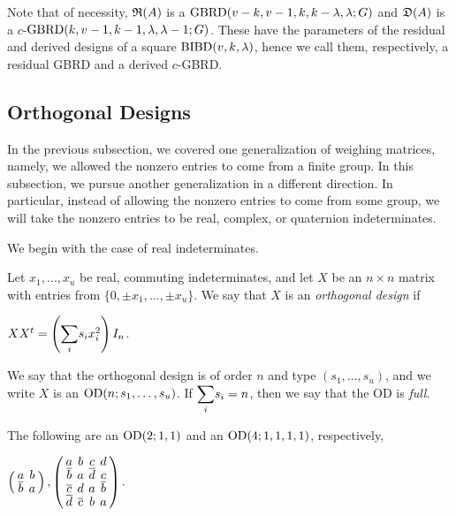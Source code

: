 \documentclass[../../../main]{subfiles}
\begin{document}
 Note that of necessity, $\mathfrak{R}(A)$ is a $\text{GBRD}(v-k,v-1,k,k-\lambda,\lambda;G)$ and $\mathfrak{D}(A)$ is a $c$-$\text{GBRD}(k,v-1,k-1,\lambda,\lambda-1;G)$. These have the parameters of the residual and derived designs of a square $\text{BIBD}(v,k,\lambda)$, hence we call them, respectively, a residual GBRD and a derived $c$-GBRD.

 \dinkus


 \subsection{Orthogonal Designs}

 In the previous subsection, we covered one generalization of weighing matrices,
 namely, we allowed the nonzero entries to come from a finite group. In this
 subsection, we pursue another generalization in a different direction. In
 particular, instead of allowing the nonzero entries to come from some group, we
will take the nonzero entries to be real, complex, or
quaternion indeterminates.

We begin with the case of real indeterminates.

\begin{defin}\label{real-od-def}
  Let $x_1, \dots, x_u$ be real, commuting indeterminates, and let $X$ be an $n \times n$ matrix with entries from $\{0,\pm x_1, \dots, \pm x_u\}$. We say that $X$ is an {\it orthogonal design} if
  \begin{defenum}
  \item\label{od-def-eq} $XX^t = \left( \ssum_i s_ix_i^2 \right)I_n$.
  \end{defenum}
  We say that the orthogonal design is of order $n$ and type $(s_1, \dots, s_u)$, and we write $X$ is an $\text{OD}(n;s_1, \dots, s_u)$. If $\ssum_i s_i=n$, then we say that the OD is {\it full}.
\end{defin}

\begin{ex}
  The following are an $\text{OD}(2;1,1)$ and an $\text{OD}(4;1,1,1,1)$, respectively,
  \begin{defenum}
  \item $
    \left(
      \arraycolsep=2.0pt\def\arraystretch{0.5}
      \begin{array}{cc}
        a & b \\ \bar{b} & a
      \end{array}
    \right),
    \left(
      \arraycolsep=2.0pt\def\arraystretch{0.5}
      \begin{array}{cccc}
        a & b & c & d \\
        \bar{b} & a & \bar{d} & c \\
        \bar{c} & d & a & \bar{b} \\
        \bar{d} & \bar{c} & b & a
      \end{array}
    \right).
    $
  \end{defenum}
\end{ex}
\end{document}
